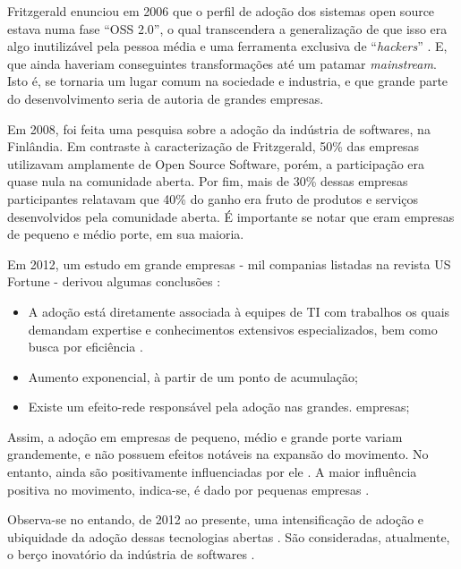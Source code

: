 \documentclass[
12pt,				%
openright,			%
oneside,			%
a4paper,			%
english,			%
french,				%
spanish,			%
brazil,				%
]{abntex2}
\begin{document}
Fritzgerald enunciou em 2006 que o perfil de adoção dos sistemas open
source estava numa fase ``OSS 2.0'', o qual transcendera a
generalização de que isso era algo inutilizável pela pessoa média e
uma ferramenta exclusiva de ``\textit{hackers}''
\cite{fitzgerald2006transformation}. E, que ainda haveriam
conseguintes transformações até um patamar \textit{mainstream}. Isto
é, se tornaria um lugar comum na sociedade e industria, e que grande
parte do desenvolvimento seria de autoria de grandes empresas.

Em 2008, foi feita uma pesquisa sobre a adoção da indústria de
softwares, na Finlândia. Em contraste à caracterização de
Fritzgerald, 50\% das empresas utilizavam amplamente de Open Source
Software, porém, a participação era quase nula na comunidade
aberta. Por fim, mais de 30\% dessas empresas participantes relatavam que 40\%
do ganho era fruto de produtos e serviços desenvolvidos pela
comunidade aberta\cite{hauge2008adoption}. É importante se notar que
eram empresas de pequeno e médio porte, em sua maioria.

Em 2012, um estudo em grande empresas - mil companias listadas na revista US
Fortune - derivou algumas conclusões \cite{spinellis2012organizational}:

\begin{itemize}
\item A adoção está diretamente associada à equipes de TI com
  trabalhos os quais demandam expertise e conhecimentos extensivos
  especializados, bem como busca por eficiência \cite{gallego2015open,
 li2013all}.
\item Aumento exponencial, à partir de um ponto de acumulação;
\item Existe um efeito-rede responsável pela adoção nas grandes.
empresas;  
\end{itemize}

Assim, a adoção em empresas de pequeno, médio e grande porte variam
grandemente, e não possuem efeitos notáveis na expansão do
movimento. No entanto, ainda são positivamente influenciadas por ele
\cite{spinellis2012organizational,hauge2008adoption,fitzgerald2006transformation}. A
maior influência positiva no movimento, indica-se, é dado por pequenas
empresas \cite{kshetri2004economics}. 

Observa-se no entando, de 2012 ao presente, uma intensificação de
adoção e ubiquidade da adoção dessas tecnologias abertas \cite{schmidt2016agile}. São
consideradas, atualmente, o berço inovatório da indústria de softwares
\cite{schrape2019open,schmidt2016agile}.
\end{document}

